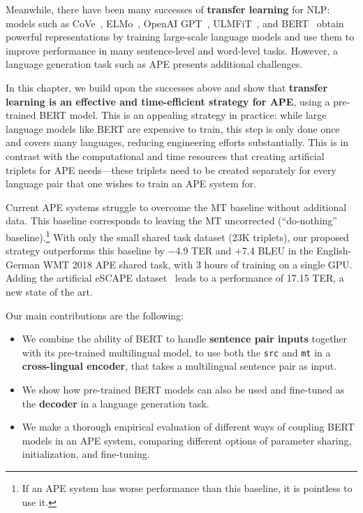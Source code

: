 Meanwhile, there have been many successes of {\bf transfer learning}
for NLP: models such as CoVe~\citep{mccann2017learned},
ELMo~\citep{peters2018deep}, OpenAI GPT~\citep{radford2018improving},
ULMFiT~\citep{howard2018universal}, and BERT~\citep{devlin2018bert}
obtain powerful representations by training large-scale language
models and use them to improve performance in many sentence-level and
word-level tasks. However, a language generation task such as APE
presents additional challenges.

In this chapter, we build upon the successes above and show that {\bf
    transfer learning is an effective and time-efficient strategy for
    APE}, using a pre-trained BERT model. This is an appealing strategy
in practice: while large language models like BERT are expensive to
train, this step is only done once and covers many languages,
reducing engineering efforts substantially. This is in contrast with
the computational and time resources that creating artificial
triplets for APE needs---these triplets need to be created separately
for every language pair that one wishes to train an APE system for.

Current APE systems struggle to overcome the MT baseline without
additional data. This baseline corresponds to leaving the MT
uncorrected (``do-nothing'' baseline).\footnote{If an APE system has
  worse performance than this baseline, it is pointless to use it.}
With only the small shared task dataset (23K triplets), our proposed
strategy outperforms this baseline by $-$4.9 TER and $+$7.4 BLEU in
the English-German WMT 2018 APE shared task, with 3 hours of training
on a single GPU. Adding the artificial eSCAPE
dataset~\citep{negri2018escape} leads to a performance of 17.15 TER,
a new state of the art.

Our main contributions are the following:
\begin{itemize}
  \item We combine the ability of BERT to
        handle {\bf sentence pair inputs} together with its pre-trained
        multilingual model, to use both the {\tt src} and {\tt mt} in a
          {\bf cross-lingual encoder}, that takes a multilingual
        sentence pair as input.
  \item We show how pre-trained BERT models can also be used and
        fine-tuned as the {\bf decoder} in a language generation task.
  \item We make a thorough empirical evaluation of different ways of
        coupling BERT models in an APE system, comparing different options
        of parameter sharing, initialization, and fine-tuning.
\end{itemize}

